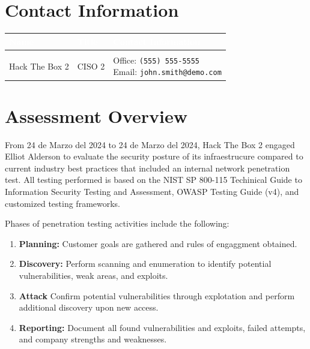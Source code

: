 \documentclass[a4paper]{article} %
\makeatletter
\newcommand{\clientName}{Hack The Box 2}
\newcommand{\clientTitle}{CISO}
\newcommand{\clientEmail}{john.smith@demo.com}
\newcommand{\clientPhone}{(555) 555-5555}
\newcommand{\theAuthor}{Elliot Alderson}
\newcommand{\theAuthorTitle}{Lead Penetration Tester}
\newcommand{\theAuthorEmail}{elliot.alderson@proton.me}
\newcommand{\startDatePentest}{24 de Marzo del 2024}
\newcommand{\finalDatePentest}{24 de Marzo del 2024}
\makeatother
\begin{document}
    \section{Contact Information} %
    \begin{table}[htbp]
        \begin{tabularx}{\textwidth}{|X|X|p{6cm}|}
            \hline
            \rowcolor{gray}
            \textbf{\textcolor{white}{Name}} & \textbf{\textcolor{white}{Title}} & \textbf{\textcolor{white}{Contact Information}} \\
            \hline
            \rowcolor{lightgray}
            \multicolumn{3}{|l|}{\textbf{\clientName}} \\
            \hline
            {\clientName} & {\clientTitle} 2 & \parbox[t]{6cm}{Office: \texttt{{\clientPhone}} \\ Email: \texttt{{\clientEmail}}} \\
            \hline
            \multicolumn{3}{|l|}{\textbf{\theAuthor}} \\
            \hline
            {\theAuthor} & {\theAuthorTitle} & Email: \texttt{\theAuthorEmail} \\
            \hline
        \end{tabularx}
    \end{table}
    \clearpage

    \section{Assessment Overview} %
    From {\startDatePentest} to {\finalDatePentest}, {\clientName} engaged {\theAuthor} to evaluate the security posture of its infraestrucure compared to current industry best practices that included an internal network penetration test. All testing performed is based on the NIST SP 800-115 Techinical Guide to Information Security Testing and Assessment, OWASP Testing Guide (v4), and customized testing frameworks.

    Phases of penetration testing activities include the following:

    \begin{enumerate}[label=\textit{\arabic*.}]
        \item \textbf{Planning:} Customer goals are gathered and rules of engaggment obtained.
        \item \textbf{Discovery:} Perform scanning and enumeration to identify potential vulnerabilities, weak areas, and exploits.
        \item \textbf{Attack} Confirm potential vulnerabilities through explotation and perform additional discovery upon new access.
        \item \textbf{Reporting:} Document all found vulnerabilities and exploits, failed attempts, and company strengths and weaknesses.
    \end{enumerate}
\end{document}
